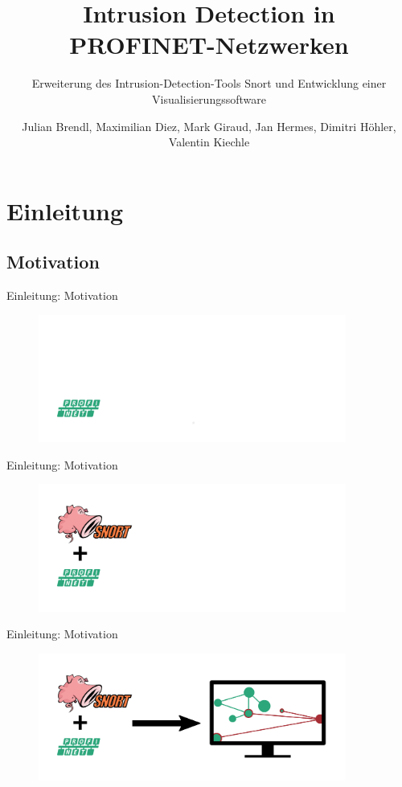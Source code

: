 \documentclass[18pt]{beamer}
\title[Intrusion Detection in PROFINET-Netzwerken]{Intrusion Detection in PROFINET-Netzwerken}
\subtitle{Erweiterung des Intrusion-Detection-Tools Snort und Entwicklung einer Visualisierungssoftware}
\author{Julian Brendl, Maximilian Diez, Mark Giraud, Jan Hermes, Dimitri Höhler, Valentin Kiechle}
\institute{Fraunhofer IOSB: Gruppe für sichere vernetzte Systeme}
\begin{document}

\begin{frame}
\titlepage
\end{frame}


\tableofcontents


\section{Einleitung}
\subsection{Motivation}
\begin{frame}{Einleitung: Motivation}
	\begin{figure}
  		\includegraphics[width=0.9\textwidth]{./images/max_1.png}
  	\end{figure}
\end{frame}
\begin{frame}{Einleitung: Motivation}
  	\begin{figure}
  		\includegraphics[width=0.9\textwidth]{./images/max_2.png}
  	\end{figure}
\end{frame}
\begin{frame}{Einleitung: Motivation}
  	\begin{figure}
  		\includegraphics[width=0.9\textwidth]{./images/max_3.png}
  	\end{figure}
\end{frame}
\end{document}
